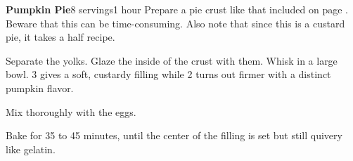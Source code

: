 \documentclass[../Cookbook.tex]{subfiles}
\begin{document}
\begin{recipe}[PumpkinPie]{\textbf{Pumpkin Pie}}{8 servings}{1 hour}
Prepare a pie crust like that included on page \pageref{PieCrust}. Beware that this can be time-consuming. Also note that since this is a custard pie, it takes a half recipe.
	
Separate the yolks. Glaze the inside of the crust with them.
Whisk in a large bowl. 3 gives a soft, custardy filling while 2 turns out firmer with a distinct pumpkin flavor.

Mix thoroughly with the eggs.

Bake for 35 to 45 minutes, until the center of the filling is set but still quivery like gelatin.

	
\end{recipe}
\end{document}
